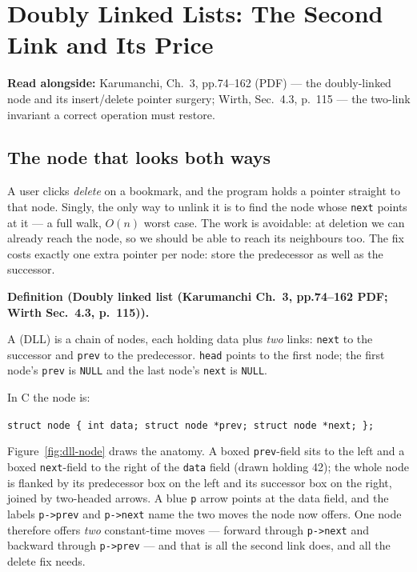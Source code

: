 \documentclass[11pt]{article}
\newenvironment{definitionbox}[1]{%
  \par\noindent\textbf{Definition (#1).}\ \itshape
}{\par\vspace{0.3em}}
\begin{document}
\section{Doubly Linked Lists: The Second Link and Its Price}

\textbf{Read alongside:} Karumanchi, Ch.~3, pp.74--162 (PDF) --- the doubly-linked node and its insert/delete pointer surgery; Wirth, Sec.~4.3, p.~115 --- the two-link invariant a correct operation must restore.

\subsection{The node that looks both ways}

A user clicks \emph{delete} on a bookmark, and the program holds a pointer straight to that node. Singly, the only way to unlink it is to find the node whose \texttt{next} points at it --- a full walk, $O(n)$ worst case. The work is avoidable: at deletion we can already reach the node, so we should be able to reach its neighbours too. The fix costs exactly one extra pointer per node: store the predecessor as well as the successor.

\begin{definitionbox}{Doubly linked list (Karumanchi Ch.~3, pp.74--162 PDF; Wirth Sec.~4.3, p.~115)}
A  (DLL) is a chain of nodes, each holding data plus \emph{two} links: \texttt{next} to the successor and \texttt{prev} to the predecessor. \texttt{head} points to the first node; the first node's \texttt{prev} is \texttt{NULL} and the last node's \texttt{next} is \texttt{NULL}. \cite{Karumanchi2017_data_structures_algorithms_made_easy,Wirth2004_algorithms_data_structures}
\end{definitionbox}

\noindent In C the node is:
\begin{center}
{\small \texttt{struct node \{ int data; struct node *prev; struct node *next; \};}}
\end{center}

Figure~\ref{fig:dll-node} draws the anatomy. A boxed \texttt{prev}-field sits to the left and a boxed \texttt{next}-field to the right of the \texttt{data} field (drawn holding 42); the whole node is flanked by its predecessor box on the left and its successor box on the right, joined by two-headed arrows. A blue \texttt{p} arrow points at the data field, and the labels \texttt{p->prev} and \texttt{p->next} name the two moves the node now offers. One node therefore offers \emph{two} constant-time moves --- forward through \texttt{p->next} and backward through \texttt{p->prev} --- and that is all the second link does, and all the delete fix needs.
\end{document}
